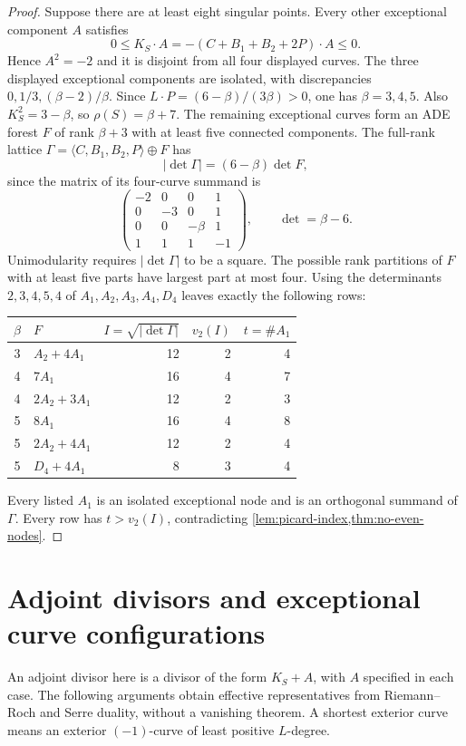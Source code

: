 \documentclass[11pt,reqno]{amsart}
\theoremstyle{definition}
\theoremstyle{remark}
\numberwithin{equation}{section}
\begin{document}
\begin{proof}
Suppose there are at least eight singular points. Every other exceptional
component $A$ satisfies
\[
 0\le K_S\cdot A=-(C+B_1+B_2+2P)\cdot A\le0.
\]
Hence $A^2=-2$ and it is disjoint from all four displayed curves.
The three displayed exceptional components are isolated, with discrepancies
$0,1/3,(\beta-2)/\beta$. Since
$L\cdot P=(6-\beta)/(3\beta)>0$, one has $\beta=3,4,5$.
Also $K_S^2=3-\beta$, so $\rho(S)=\beta+7$.
The remaining exceptional curves form an ADE forest $F$ of rank
$\beta+3$ with at least five connected components.
The full-rank lattice $\Gamma=\langle C,B_1,B_2,P\rangle\oplus F$
has
\[
 |\det\Gamma|=(6-\beta)\det F,
\]
since the matrix of its four-curve summand is
\[
 \begin{pmatrix}-2&0&0&1\\0&-3&0&1\\0&0&-\beta&1\\1&1&1&-1\end{pmatrix},
 \qquad \det=\beta-6.
\]
Unimodularity requires $|\det\Gamma|$ to be a square.
The possible rank partitions of $F$ with at least five parts have
largest part at most four. Using the determinants $2,3,4,5,4$ of
$A_1,A_2,A_3,A_4,D_4$ leaves exactly the following rows:
\begin{center}\small
\begin{tabular}{clrrr}
\toprule
$\beta$&$F$&$I=\sqrt{|\det\Gamma|}$&$v_2(I)$&$t=\#A_1$\\\midrule
3&$A_2+4A_1$&12&2&4\\
4&$7A_1$&16&4&7\\
4&$2A_2+3A_1$&12&2&3\\
5&$8A_1$&16&4&8\\
5&$2A_2+4A_1$&12&2&4\\
5&$D_4+4A_1$&8&3&4\\\bottomrule
\end{tabular}
\end{center}
Every listed $A_1$ is an isolated exceptional node and is an orthogonal
summand of $\Gamma$. Every row has $t>v_2(I)$, contradicting
\cref{lem:picard-index,thm:no-even-nodes}.
\end{proof}


\section{Adjoint divisors and exceptional curve configurations}
\label{sec:adjoints}
An adjoint divisor here is a divisor of the form $K_S+A$, with $A$
specified in each case. The following arguments obtain effective
representatives from Riemann--Roch and Serre duality, without a
vanishing theorem. A shortest exterior curve means an exterior
$(-1)$-curve of least positive $L$-degree.
\end{document}
